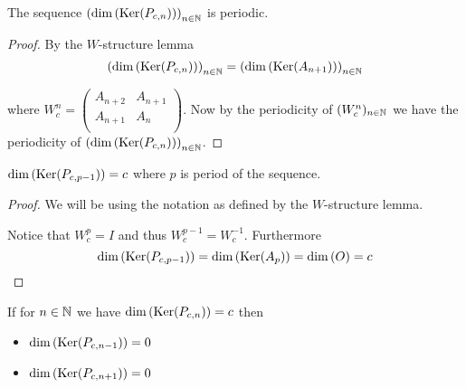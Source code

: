 \begin{proposition}
  The sequence $\left(\dim\left(\operatorname{Ker}(P_{c,n})\right)\right)_{n\in\mathbb{N}}$
  is periodic.
\end{proposition}

\begin{proof}
  By the $W$-structure lemma
  \[
  \left(\dim\left(\operatorname{Ker}(P_{c,n})\right)\right)_{n\in\mathbb{N}} 
  = 
  \left(\dim\left(\operatorname{Ker}(A_{n+1})\right)\right)_{n\in\mathbb{N}}
  \]

  where $W_{c}^{n}=\left(\begin{smallmatrix} A_{n+2} & A_{n+1}  \\ A_{n+1} & A_{n} \\\end{smallmatrix}\right)$.
  Now  by the periodicity of $(W_{c}^{n})_{n\in\mathbb{N}}$ we have the
  periodicity of
  $\left(\dim\left(\operatorname{Ker}(P_{c,n})\right)\right)_{n\in\mathbb{N}}$.
\end{proof}

\begin{lemma}
  $\dim\left(\operatorname{Ker}(P_{c,p-1})\right) = c$ where $p$ is period of the sequence. 
\end{lemma}

\begin{proof}
  We will be using the notation as defined by the $W$-structure lemma.

  Notice that $W_{c}^{p} = I$ and thus $W_{c}^{p-1} = W_{c}^{-1}$.
  Furthermore
  \[
  \dim\left(\operatorname{Ker}(P_{c,p-1})\right)
  =
  \dim\left(\operatorname{Ker}(A_{p})\right) = \dim\left(O\right)
  = c
  \]
\end{proof}

\begin{lemma}
  If for $n\in\mathbb{N}$ we have $\dim\left(\operatorname{Ker}(P_{c,n})\right) = c$ then
  \begin{itemize}
    \item $\dim\left(\operatorname{Ker}(P_{c,n-1})\right) = 0$
    \item $\dim\left(\operatorname{Ker}(P_{c,n+1})\right) = 0$
  \end{itemize}
\end{lemma}

